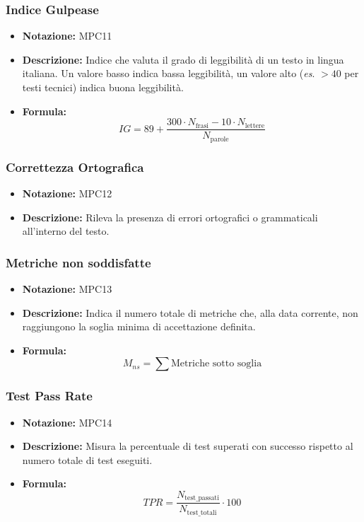 \documentclass[a4paper,12pt]{article}
\begin{document}
        \subsubsection{Indice Gulpease}
            \begin{itemize}
                \item \textbf{Notazione:} MPC11
                \item \textbf{Descrizione:} Indice che valuta il grado di leggibilità di un testo in lingua italiana. Un valore basso indica bassa leggibilità, un valore alto (\textit{es}. $>40$ per testi tecnici) indica buona leggibilità.
                \item \textbf{Formula:} 
                \[ IG = 89 + \frac{300 \cdot N_\text{frasi} - 10 \cdot N_\text{lettere}}{N_\text{parole}} \]
            \end{itemize}

        \subsubsection{Correttezza Ortografica}
            \begin{itemize}
                \item \textbf{Notazione:} MPC12
                \item \textbf{Descrizione:} Rileva la presenza di errori ortografici o grammaticali all'interno del testo.
            \end{itemize}

        \subsubsection{Metriche non soddisfatte}
        \begin{itemize}
                \item \textbf{Notazione:} MPC13
                \item \textbf{Descrizione:} Indica il numero totale di metriche che, alla data corrente, non raggiungono la soglia minima di accettazione definita.
                \item \textbf{Formula:} 
                \[ M_{ns} = \sum \text{Metriche sotto soglia} \]
            \end{itemize}

        \subsubsection{Test Pass Rate}
            \begin{itemize}
                \item \textbf{Notazione:} MPC14
                \item \textbf{Descrizione:} Misura la percentuale di test superati con successo rispetto al numero totale di test eseguiti.
                \item \textbf{Formula:} 
                \[ TPR = \frac{N_\text{test\_passati}}{N_\text{test\_totali}} \cdot 100 \]
            \end{itemize}
\end{document}
